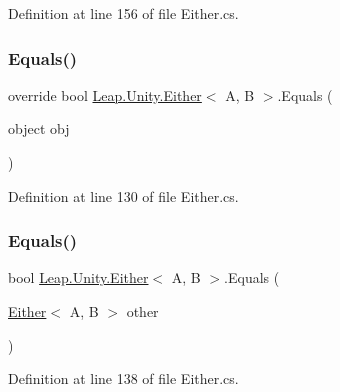 Definition at line 156 of file Either.\+cs.

\mbox{\label{struct_leap_1_1_unity_1_1_either_ab1a67555ab3c674e42abce4fd3365134}} 
\subsubsection{\texorpdfstring{Equals()}{Equals()}\hspace{0.1cm}{\footnotesize\ttfamily [1/2]}}
{\footnotesize\ttfamily override bool \mbox{\hyperlink{struct_leap_1_1_unity_1_1_either}{Leap.\+Unity.\+Either}}$<$ A, B $>$.Equals (\begin{DoxyParamCaption}\item[{object}]{obj }\end{DoxyParamCaption})}



Definition at line 130 of file Either.\+cs.

\mbox{\label{struct_leap_1_1_unity_1_1_either_ae55d660db9359d936f67d988d7078cc1}} 
\subsubsection{\texorpdfstring{Equals()}{Equals()}\hspace{0.1cm}{\footnotesize\ttfamily [2/2]}}
{\footnotesize\ttfamily bool \mbox{\hyperlink{struct_leap_1_1_unity_1_1_either}{Leap.\+Unity.\+Either}}$<$ A, B $>$.Equals (\begin{DoxyParamCaption}\item[{\mbox{\hyperlink{struct_leap_1_1_unity_1_1_either}{Either}}$<$ A, B $>$}]{other }\end{DoxyParamCaption})}



Definition at line 138 of file Either.\+cs.

\mbox{\label{struct_leap_1_1_unity_1_1_either_a033f69b0b8238d2f434d49d097e94788}} 
